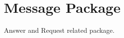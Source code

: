 \hypertarget{group__message}{\section{Message Package}
\label{group__message}
}
Answer and Request related package. 